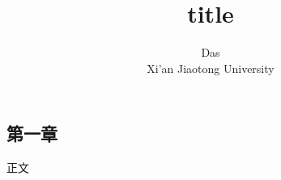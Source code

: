\documentclass[12pt,a4paper]{article}
\title{\fontsize{40}{20}\selectfont title}
\author{\fontsize{20}{16}\selectfont Das\\Xi'an Jiaotong University}
\begin{document}
\maketitle
\newpage
\tableofcontents %
\newpage

\begin{sloppypar}%
\begin{flushleft}

\section{第一章}
正文





\end{flushleft}
\end{sloppypar}
\end{document}
